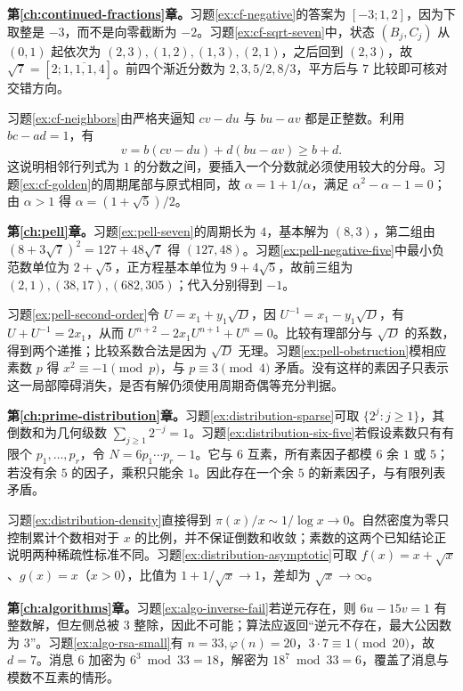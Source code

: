 \documentclass[UTF8,12pt,a4paper,fontset=fandol]{ctexbook}
\begin{document}
\textbf{第\ref{ch:continued-fractions}章。}习题\ref{ex:cf-negative}的答案为 $[-3;1,2]$，因为下取整是 $-3$，而不是向零截断为 $-2$。习题\ref{ex:cf-sqrt-seven}中，状态 $(B_j,C_j)$ 从 $(0,1)$ 起依次为 $(2,3),(1,2),(1,3),(2,1)$，之后回到 $(2,3)$，故 $\sqrt7=[2;\overline{1,1,1,4}]$。前四个渐近分数为 $2,3,5/2,8/3$，平方后与 $7$ 比较即可核对交错方向。

习题\ref{ex:cf-neighbors}由严格夹逼知 $cv-du$ 与 $bu-av$ 都是正整数。利用 $bc-ad=1$，有
\[
 v=b(cv-du)+d(bu-av)\ge b+d.
\]
这说明相邻行列式为 $1$ 的分数之间，要插入一个分数就必须使用较大的分母。习题\ref{ex:cf-golden}的周期尾部与原式相同，故 $\alpha=1+1/\alpha$，满足 $\alpha^2-\alpha-1=0$；由 $\alpha>1$ 得 $\alpha=(1+\sqrt5)/2$。

\textbf{第\ref{ch:pell}章。}习题\ref{ex:pell-seven}的周期长为 $4$，基本解为 $(8,3)$，第二组由 $(8+3\sqrt7)^2=127+48\sqrt7$ 得 $(127,48)$。习题\ref{ex:pell-negative-five}中最小负范数单位为 $2+\sqrt5$，正方程基本单位为 $9+4\sqrt5$，故前三组为 $(2,1),(38,17),(682,305)$；代入分别得到 $-1$。

习题\ref{ex:pell-second-order}令 $U=x_1+y_1\sqrt D$，因 $U^{-1}=x_1-y_1\sqrt D$，有 $U+U^{-1}=2x_1$，从而 $U^{n+2}-2x_1U^{n+1}+U^n=0$。比较有理部分与 $\sqrt D$ 的系数，得到两个递推；比较系数合法是因为 $\sqrt D$ 无理。习题\ref{ex:pell-obstruction}模相应素数 $p$ 得 $x^2\equiv-1\pmod p$，与 $p\equiv3\pmod4$ 矛盾。没有这样的素因子只表示这一局部障碍消失，是否有解仍须使用周期奇偶等充分判据。

\textbf{第\ref{ch:prime-distribution}章。}习题\ref{ex:distribution-sparse}可取 $\{2^j:j\ge1\}$，其倒数和为几何级数 $\sum_{j\ge1}2^{-j}=1$。习题\ref{ex:distribution-six-five}若假设素数只有有限个 $p_1,\ldots,p_r$，令 $N=6p_1\cdots p_r-1$。它与 $6$ 互素，所有素因子都模 $6$ 余 $1$ 或 $5$；若没有余 $5$ 的因子，乘积只能余 $1$。因此存在一个余 $5$ 的新素因子，与有限列表矛盾。

习题\ref{ex:distribution-density}直接得到 $\pi(x)/x\sim1/\log x\to0$。自然密度为零只控制累计个数相对于 $x$ 的比例，并不保证倒数和收敛；素数的这两个已知结论正说明两种稀疏性标准不同。习题\ref{ex:distribution-asymptotic}可取 $f(x)=x+\sqrt x$、$g(x)=x$（$x>0$），比值为 $1+1/\sqrt x\to1$，差却为 $\sqrt x\to\infty$。

\textbf{第\ref{ch:algorithms}章。}习题\ref{ex:algo-inverse-fail}若逆元存在，则 $6u-15v=1$ 有整数解，但左侧总被 $3$ 整除，因此不可能；算法应返回“逆元不存在，最大公因数为 $3$”。习题\ref{ex:algo-rsa-small}有 $n=33,\varphi(n)=20$，$3\cdot7\equiv1\pmod{20}$，故 $d=7$。消息 $6$ 加密为 $6^3\bmod33=18$，解密为 $18^7\bmod33=6$，覆盖了消息与模数不互素的情形。
\end{document}
